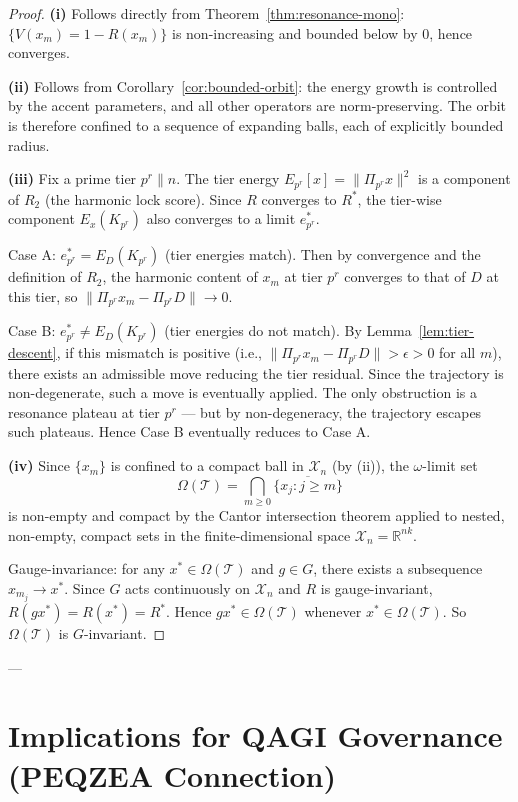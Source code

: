 \documentclass[11pt]{amsart}
\newcommand{\X}{\mathcal{X}}
\newcommand{\Prj}{\Pi}
\newcommand{\R}{\mathbb{R}}
\newcommand{\norm}[1]{\lVert #1 \rVert}
\begin{document}
\begin{proof}
\textbf{(i)} Follows directly from Theorem~\ref{thm:resonance-mono}: $\{V(x_m) = 1 - R(x_m)\}$ is non-increasing and bounded below by $0$, hence converges.

\textbf{(ii)} Follows from Corollary~\ref{cor:bounded-orbit}: the energy growth is controlled by the accent parameters, and all other operators are norm-preserving. The orbit is therefore confined to a sequence of expanding balls, each of explicitly bounded radius.

\textbf{(iii)} Fix a prime tier $p^r \| n$. The tier energy $E_{p^r}[x] = \norm{\Prj_{p^r} x}^2$ is a component of $R_2$ (the harmonic lock score). Since $R$ converges to $R^*$, the tier-wise component $E_x(K_{p^r})$ also converges to a limit $e^*_{p^r}$.

Case A: $e^*_{p^r} = E_D(K_{p^r})$ (tier energies match). Then by convergence and the definition of $R_2$, the harmonic content of $x_m$ at tier $p^r$ converges to that of $D$ at this tier, so $\norm{\Prj_{p^r} x_m - \Prj_{p^r} D} \to 0$.

Case B: $e^*_{p^r} \neq E_D(K_{p^r})$ (tier energies do not match). By Lemma~\ref{lem:tier-descent}, if this mismatch is positive (i.e., $\norm{\Prj_{p^r} x_m - \Prj_{p^r} D} > \epsilon > 0$ for all $m$), there exists an admissible move reducing the tier residual. Since the trajectory is non-degenerate, such a move is eventually applied. The only obstruction is a resonance plateau at tier $p^r$ — but by non-degeneracy, the trajectory escapes such plateaus. Hence Case B eventually reduces to Case A.

\textbf{(iv)} Since $\{x_m\}$ is confined to a compact ball in $\X_n$ (by (ii)), the $\omega$-limit set
\[
  \Omega(\mathcal{T}) = \bigcap_{m \geq 0} \overline{\{x_j : j \geq m\}}
\]
is non-empty and compact by the Cantor intersection theorem applied to nested, non-empty, compact sets in the finite-dimensional space $\X_n = \R^{nk}$.

Gauge-invariance: for any $x^* \in \Omega(\mathcal{T})$ and $g \in G$, there exists a subsequence $x_{m_j} \to x^*$. Since $G$ acts continuously on $\X_n$ and $R$ is gauge-invariant, $R(g x^*) = R(x^*) = R^*$. Hence $g x^* \in \Omega(\mathcal{T})$ whenever $x^* \in \Omega(\mathcal{T})$. So $\Omega(\mathcal{T})$ is $G$-invariant.
\end{proof}

---

\section{Implications for QAGI Governance (PEQZEA Connection)}
\end{document}
